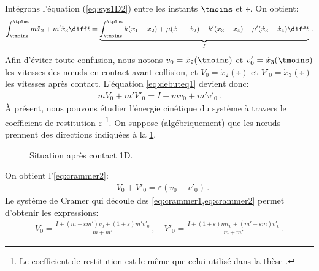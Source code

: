 \noindent Intégrons l'équation (\ref{eq:sys1D2}) entre les instants $\tmoins$ et $\tplus$. On obtient:
\begin{align}    \label{eq:debuteq1}
    \int_{\tmoins}^{\tplus} m\ddot x_2 + m'\ddot x_3 \diff t = \underbrace{\int_{\tmoins}^{\tplus} k(x_1 - x_2) + \mu (\dot x_1 - \dot x_2) - k'(x_3 - x_4) - \mu'(\dot x_3 - \dot x_4) \diff t}_{I} \,.
\end{align}
Afin d'éviter toute confusion, nous notons $v_0 = \dot{x}_2(\tmoins)$ et $v'_0 = \dot{x}_3(\tmoins)$ les vitesses des n\oe{}uds en contact avant collision, et $V_0 = \dot{x}_2(\tplus)$ et $V'_0 = \dot{x}_3(\tplus)$ les vitesses après contact. L'équation \cref{eq:debuteq1} devient donc:
\begin{align} \label{eq:crammer1}
    mV_0 + m'V'_0 = I + mv_0 + m'v'_0 \,.
\end{align}
À présent, nous pouvons étudier l'énergie cinétique du système à travers le coefficient de restitution $\varepsilon$ \footnote{Le coefficient de restitution est le même que celui utilisé dans la thèse \parencite{rabatel2015thesis}.}. On suppose (algébriquement) que les n\oe{}uds prennent des directions indiquées à la \cref{fig:contact1dapres}. 
\begin{figure}[!h]
    \centering
    \caption{Situation après contact 1D.}
    \label{fig:contact1dapres}
\end{figure}

\noindent On obtient l'\cref{eq:crammer2}:
\begin{align} \label{eq:crammer2}
    - V_0 + V'_0 = \varepsilon (v_0 - v'_0) \,.
\end{align}
Le système de Cramer qui découle des \cref{eq:crammer1,eq:crammer2} permet d'obtenir les expressions:
\begin{align} \label{eq:vitessesapres1D}
    V_0 = \frac{I + (m-\varepsilon m')v_0 + (1+\varepsilon)m'v'_0}{m+m'} \,, \quad V'_0 = \frac{I + (1+\varepsilon)mv_0 + (m'-\varepsilon m)v'_0}{m+m'}\,.
\end{align}



